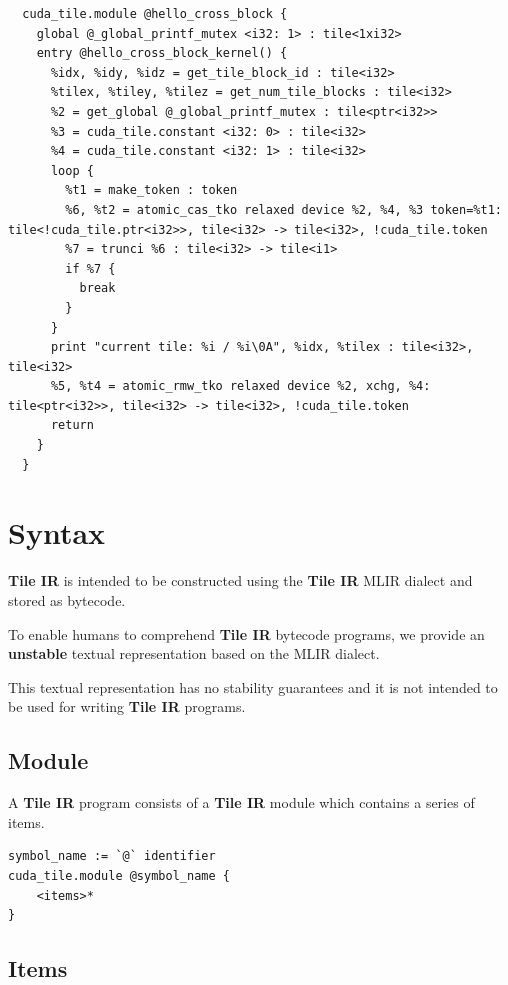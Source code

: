 \documentclass{article}
\begin{document}
\begin{lstlisting}
  cuda_tile.module @hello_cross_block {
    global @_global_printf_mutex <i32: 1> : tile<1xi32>
    entry @hello_cross_block_kernel() {
      %idx, %idy, %idz = get_tile_block_id : tile<i32>
      %tilex, %tiley, %tilez = get_num_tile_blocks : tile<i32>
      %2 = get_global @_global_printf_mutex : tile<ptr<i32>>
      %3 = cuda_tile.constant <i32: 0> : tile<i32>
      %4 = cuda_tile.constant <i32: 1> : tile<i32>
      loop {
        %t1 = make_token : token
        %6, %t2 = atomic_cas_tko relaxed device %2, %4, %3 token=%t1: tile<!cuda_tile.ptr<i32>>, tile<i32> -> tile<i32>, !cuda_tile.token
        %7 = trunci %6 : tile<i32> -> tile<i1>
        if %7 {
          break
        }
      }
      print "current tile: %i / %i\0A", %idx, %tilex : tile<i32>, tile<i32>
      %5, %t4 = atomic_rmw_tko relaxed device %2, xchg, %4: tile<ptr<i32>>, tile<i32> -> tile<i32>, !cuda_tile.token
      return
    }
  }
\end{lstlisting}

\newpage
\section{Syntax}

\textbf{Tile IR} is intended to be constructed using the \textbf{Tile IR} MLIR dialect and stored as bytecode.


To enable humans to comprehend \textbf{Tile IR} bytecode programs, we provide an \textbf{unstable} textual representation based on the MLIR dialect.

This textual representation has no stability guarantees and it is not intended to be used for writing \textbf{Tile IR} programs.


\subsection{Module}

A \textbf{Tile IR} program consists of a \textbf{Tile IR} module which contains a series of items.


\begin{lstlisting}
symbol_name := `@` identifier
cuda_tile.module @symbol_name {
    <items>*
}
\end{lstlisting}


\subsection{Items}
\end{document}

